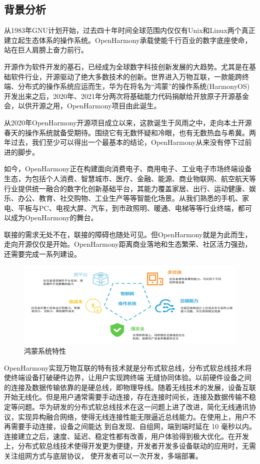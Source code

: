 \documentclass[12pt,a4paper]{ctexart}
\begin{document}
\subsection{背景分析}
从1983年GNU计划开始，过去四十年时间全球范围内仅仅有Unix和Linux两个真正建立起生态体系的操作系统。OpenHarmony承载使能千行百业的数字底座使命，站在巨人肩膀上奋力前行。\par
开源作为软件开发的基石，已经成为全球数字科技创新发展的大趋势。尤其是在基础软件行业，开源驱动了绝大多数技术的创新。世界进入万物互联，一款能跨终端、分布式的操作系统应运而生，华为在将名为“鸿蒙”的操作系统(HarmonyOS)开发出来之后，2020年、2021年分两次将基础能力代码捐献给开放原子开源基金会，以供开源之用，OpenHarmony项目由此诞生。\par
从2020年OpenHarmony开源项目成立以来，这款诞生于风雨之中，走向本土开源春天的操作系统就备受期待。围绕它有无数怀疑和冷眼，也有无数热血与希冀。两年过去，我们至少可以得出一个最基本的结论，OpenHarmony从来没有停下过前进的脚步。\par
如今，OpenHarmony正在构建面向消费电子、商用电子、工业电子市场终端设备生态，为包括个人消费、智慧城市、医疗、金融、能源、商业物联网、航空航天等行业提供统一融合的数字化创新基础平台，其能力覆盖家居、出行、运动健康、娱乐、办公、教育、社交购物、工业生产等等智能化场景。从我们熟悉的手机、家电、平板与PC、电视大屏、汽车，到市政照明、暖通、电梯等等行业终端，都可以成为OpenHarmony的舞台。\par
联接的需求无处不在，联接的障碍也随处可见。但OpenHarmony就是为此而生，走向开源仅仅是开始。OpenHarmony距离商业落地和生态繁荣、社区活力强劲，还需要完成一系列建设。
\begin{figure}[H]
\centering
\includegraphics[width=0.8\columnwidth]{./pic/11.png}
\caption{\small{鸿蒙系统特性}}
\end{figure}
\restoregeometry
OpenHarmony实现万物互联的特有技术就是分布式软总线，分布式软总线技术将使终端设备打破硬件边界，让用户实现跨终端 无缝协同体验。以前硬件设备之间的连接及数据传输依靠的是硬总线，即物理导线。随着无线技术的发展，设备互联开始无线化。但是用户通常需要手动连接，存在连接时间长，连接及数据传输不稳定等问题。华为研发的分布式软总线技术在这一问题上进了改进，简化无线通讯协议，实现异构融合网络，使得无线连接性能无限逼近总线能力。在使用上，用户不再需要手动连接，设备之间能达 到自发现、自组网，端到端时延在 10 毫秒以内。连接建立之后，速度、延迟、稳定性都有改善，用户体验得到极大优化。在开发上，分布式软总线技术使得开发更为便捷，开发者开发多设备联动的应用时，无需关注组网方式与底层协议， 使开发者可以一次开发，多端部署。
\end{document}
